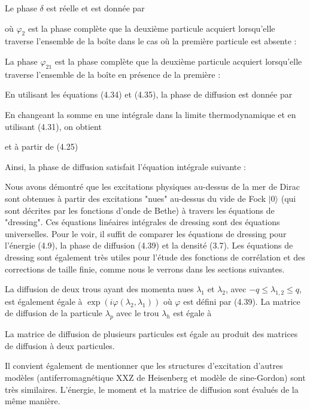 Le phase \( \delta \) est réelle et est donnée par


où \( \varphi_2 \) est la phase complète que la deuxième particule acquiert lorsqu'elle traverse l'ensemble de la boîte dans le cas où la première particule est absente :

La phase \( \varphi_{21} \) est la phase complète que la deuxième particule acquiert lorsqu'elle traverse l'ensemble de la boîte en présence de la première :

En utilisant les équations (4.34) et (4.35), la phase de diffusion est donnée par

En changeant la somme en une intégrale dans la limite thermodynamique et en utilisant (4.31), on obtient

et à partir de (4.25)

Ainsi, la phase de diffusion satisfait l'équation intégrale suivante :

Nous avons démontré que les excitations physiques au-dessus de la mer de Dirac sont obtenues à partir des excitations "nues" au-dessus du vide de Fock \( |0\rangle \) (qui sont décrites par les fonctions d'onde de Bethe) à travers les équations de "dressing". Ces équations linéaires intégrales de dressing sont des équations universelles. Pour le voir, il suffit de comparer les équations de dressing pour l'énergie (4.9), la phase de diffusion (4.39) et la densité (3.7). Les équations de dressing sont également très utiles pour l'étude des fonctions de corrélation et des corrections de taille finie, comme nous le verrons dans les sections suivantes.

La diffusion de deux trous ayant des momenta nues \( \lambda_1 \) et \( \lambda_2 \), avec \( -q \leq \lambda_{1, 2} \leq q \), est également égale à \( \exp\left(i \varphi(\lambda_2, \lambda_1)\right) \) où \( \varphi \) est défini par (4.39). La matrice de diffusion de la particule \( \lambda_p \) avec le trou \( \lambda_h \) est égale à


La matrice de diffusion de plusieurs particules est égale au produit des matrices de diffusion à deux particules.

Il convient également de mentionner que les structures d'excitation d'autres modèles (antiferromagnétique XXZ de Heisenberg et modèle de sine-Gordon) sont très similaires. L'énergie, le moment et la matrice de diffusion sont évalués de la même manière.







